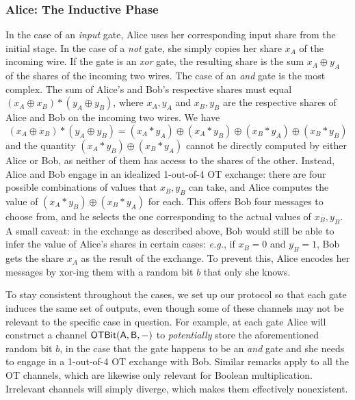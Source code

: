 \subsubsection{Alice: The Inductive Phase}
In the case of an \emph{input} gate, Alice uses her corresponding input share from the initial stage. In the case of a \emph{not} gate, she simply copies her share $x_A$ of the incoming wire. If the gate is an \emph{xor} gate, the resulting share is the sum $x_A \oplus y_A$ of the shares of the incoming two wires. The case of an \emph{and} gate is the most complex. The sum of Alice's and Bob's respective shares must equal $(x_A \oplus x_B) * (y_A \oplus y_B)$, where $x_A,y_A$ and $x_B,y_B$ are the respective shares of Alice and Bob on the incoming two wires. We have
\[(x_A \oplus x_B) * (y_A \oplus y_B) = (x_A * y_A) \oplus (x_A * y_B) \oplus (x_B * y_A) \oplus (x_B * y_B)\]
and the quantity $(x_A * y_B) \oplus (x_B * y_A)$ cannot be directly computed by either Alice or Bob, as neither of them has access to the shares of the other. Instead, Alice and Bob engage in an idealized 1-out-of-4 OT exchange: there are four possible combinations of values that $x_B,y_B$ can take, and Alice computes the value of $(x_A * y_B) \oplus (x_B * y_A)$ for each. This offers Bob four messages to choose from, and he selects the one corresponding to the actual values of $x_B,y_B$. A small caveat: in the exchange as described above, Bob would still be able to infer the value of Alice's shares in certain cases: \emph{e.g.}, if $x_B = 0$ and $y_B = 1$, Bob gets the share $x_A$ as the result of the exchange. To prevent this, Alice encodes her messages by xor-ing them with a random bit $b$ that only she knows.

To stay consistent throughout the cases, we set up our protocol so that each gate induces the same set of outputs, even though some of these channels may not be relevant to the specific case in question. For example, at each gate Alice will construct a channel $\mathsf{OTBit}(\mathsf{A},\mathsf{B},-)$ to \emph{potentially} store the aforementioned random bit $b$, in the case that the gate happens to be an \emph{and} gate and she needs to engage in a 1-out-of-4 OT exchange with Bob. Similar remarks apply to all the OT channels, which are likewise only relevant for Boolean multiplication. Irrelevant channels will simply diverge, which makes them effectively nonexistent.

